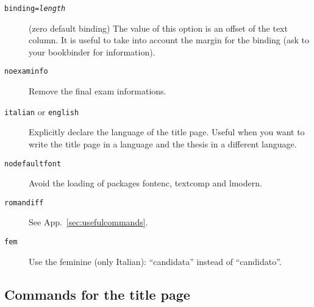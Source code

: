 \documentclass[a5paper,11pt]{article}
\begin{document}
\begin{description}
\item[\texttt{binding=\textsl{length}}] (zero default binding)
The value of this option is an offset of the text column.
It is useful to take into account the margin for the binding (ask to your bookbinder for information).
\item[\texttt{noexaminfo}] Remove the final exam informations.
\item[\texttt{italian} or \texttt{english}] Explicitly declare the language of 
the title page. Useful when you want to write the title page in a language 
and the thesis in a different language.
\item[\texttt{nodefaultfont}] Avoid the loading of packages \textsf{fontenc}, \textsf{textcomp} and \textsf{lmodern}.
\item[\texttt{romandiff}] See App.~\ref{sec:usefulcommands}.
\item[\texttt{fem}] Use the feminine (only Italian): ``candidata'' instead of ``candidato''.
\end{description}

\subsection[Commands for the\\ title page]{Commands for the title page}
\label{commands_titlepage}
\end{document}

